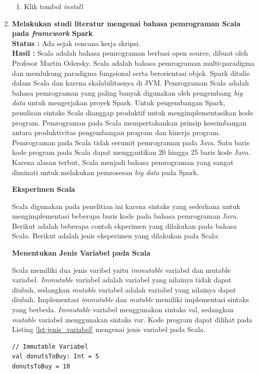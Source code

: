 \documentclass[a4paper,twoside]{article}
\begin{document}
\begin{enumerate}
\begin{enumerate}
\item Klik tombol \textit{install}

\end{enumerate}

		
		\item \textbf{Melakukan studi literatur mengenai bahasa pemrograman Scala pada \textit{framework} Spark}\\
		{\bf Status :} Ada sejak rencana kerja skripsi.\\
		{\bf Hasil :} Scala adalah bahasa pemrograman berbasi open source, dibuat oleh Profesor Martin Odersky. Scala adalah bahasa pemrograman multi-paradigma dan mendukung paradigma fungsional serta berorientasi objek. Spark ditulis dalam Scala dan karena skalabilitasnya di JVM. Pemrograman Scala adalah bahasa pemrograman yang paling banyak digunakan oleh pengembang \textit{big data} untuk mengerjakan proyek Spark. Untuk pengembangan Spark, penulisan sintaks Scala dianggap produktif untuk mengimplementasikan kode program. Pemrograman pada Scala mempertahankan prinsip keseimbangan antara produktivitas pengembangan program dan kinerja program. Pemrograman pada Scala tidak serumit pemrograman pada Java. Satu baris kode program pada Scala dapat menggantikan 20 hingga 25 baris kode Java. Karena alasan terbut, Scala menjadi bahasa pemrograman yang sangat diminati untuk melakukan pemrosesan \textit{big data} pada Spark.

\textbf{Eksperimen Scala}

Scala digunakan pada penelitian ini karena sintaks yang sederhana untuk mengimplementasi beberapa baris kode pada bahasa pemrograman Java. Berikut adalah beberapa contoh ekperimen yang dilakukan pada bahasa Scala. Berikut adalah jenis eksperimen yang dilakukan pada Scala:

\textbf{Menentukan Jenis Variabel pada Scala}

Scala memiliki dua jenis varibel yaitu \textit{immutable} variabel dan mutable variabel. \textit{Immutable} variabel adalah variabel yang nilainya tidak dapat diubah, sedangkan \textit{mutable} variabel adalah variabel yang nilainya dapat diubah. Implementasi \textit{immutable} dan \textit{mutable} memiliki implementasi sintaks yang berbeda. \textit{Immutable} variabel menggunakan sintaks val, sedangkan \textit{mutable} variabel menggunakan sintaks var. Kode program dapat dilihat pada Listing \ref{lst:jenis_variabel} mengenai jenis variabel pada Scala. 

\begin{lstlisting}[basicstyle=\ttfamily, frame=single,
	columns=fullflexible, keepspaces=true, breaklines=true, label=lst:jenis_variabel, caption=Menentukan Jenis Variabel pada Scala]
// Immutable Variabel
val donutsToBuy: Int = 5
donutsToBuy = 10


\end{lstlisting}
\end{enumerate}
\end{document}

